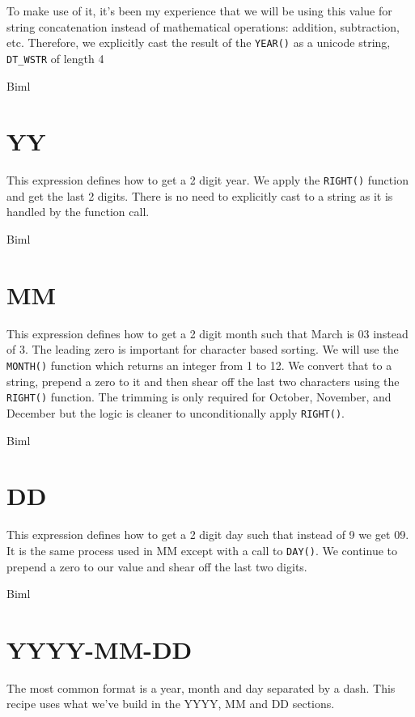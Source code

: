 

To make use of it, it's been my experience that we will be using this value for string concatenation instead of mathematical operations: addition, subtraction, etc. Therefore, we explicitly cast the result of the \verb|YEAR()| as a unicode string, \verb|DT_WSTR| of length 4

Biml



\section{YY}
This expression defines how to get a 2 digit year. We apply the \verb|RIGHT()| function and get the last 2 digits. There is no need to explicitly cast to a string as it is handled by the function call.



Biml


\section{MM}
This expression defines how to get a 2 digit month such that March is 03 instead of 3. The leading zero is important for character based sorting. We will use the \verb|MONTH()| function which returns an integer from 1 to 12. We convert that to a string, prepend a zero to it and then shear off the last two characters using the \verb|RIGHT()| function. The trimming is only required for October, November, and December but the logic is cleaner to unconditionally apply \verb|RIGHT()|.



Biml


\section{DD}
This expression defines how to get a 2 digit day such that instead of 9 we get 09. It is the same process used in MM except with a call to  \verb|DAY()|. We continue to prepend a zero to our value and shear off the last two digits.



Biml


\section{YYYY-MM-DD}
The most common format is a year, month and day separated by a dash. This recipe uses what we've build in the YYYY, MM and DD sections.


